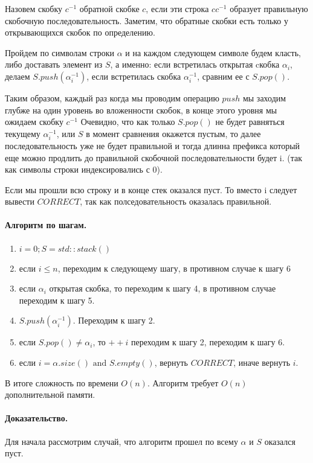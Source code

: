 \documentclass[12pt]{article}
\begin{document}
Назовем скобку $ c^{-1} $ обратной скобке $ c $, если эти строка $ cc^{-1} $ образует правильную скобочную последовательность.
Заметим, что обратные скобки есть только у открывающихся скобок по определению.

Пройдем по символам строки $ \alpha $ и на каждом следующем символе будем класть, либо доставать элемент из $ S $, а именно:
если встретилась открытая cкобка $ \alpha_i $, делаем $ S.push(\alpha_i^{-1}) $, если встретилась скобка $\alpha_i^{-1}$, сравним ее 
с $ S.pop() $.

Таким образом, каждый раз когда мы проводим операцию $ push $ мы заходим глубже на один уровень во вложенности скобок, в
конце этого уровня мы ожидаем скобку $ c^{-1} $
Очевидно, что как только $ S.pop() $ не будет равняться текущему $ \alpha_i^{-1} $, или $ S $ в момент сравнения окажется пустым, 
то далее последовательность уже не будет правильной и тогда длинна префикса который еще можно продлить до правильной скобочной 
последовательности будет i. (так как символы строки индексировались с 0).

Если мы прошли всю строку и в конце стек оказался пуст. То вместо i следует вывести $ CORRECT $, так как полседовательность оказалась правильной.


\paragraph{Алгоритм по шагам.}
\begin{enumerate}
    \item $i = 0; S = std::stack() $
    \item если $ i \le n $, переходим к следующему шагу, в противном случае к шагу 6
    \item если $ \alpha_i $ открытая скобка, то переходим к шагу 4, в противном случае переходим к шагу 5.
    \item $ S.push(\alpha_i^{-1}) $. Переходим к шагу 2.
    \item если $ S.pop() \ne \alpha_i $, то $ ++i $ переходим к шагу 2, переходим к шагу 6.
    \item если $ i = \alpha.size() \mbox{ and } S.empty() $, вернуть $ CORRECT $, иначе вернуть $ i $.
\end{enumerate}

В итоге сложность по времени $O(n)$. Алгоритм требует $O(n)$ дополнительной памяти.


\paragraph{Доказательство.}
Для начала рассмотрим случай, что алгоритм прошел по всему $ \alpha $ и $ S $ оказался пуст.
\end{document}

